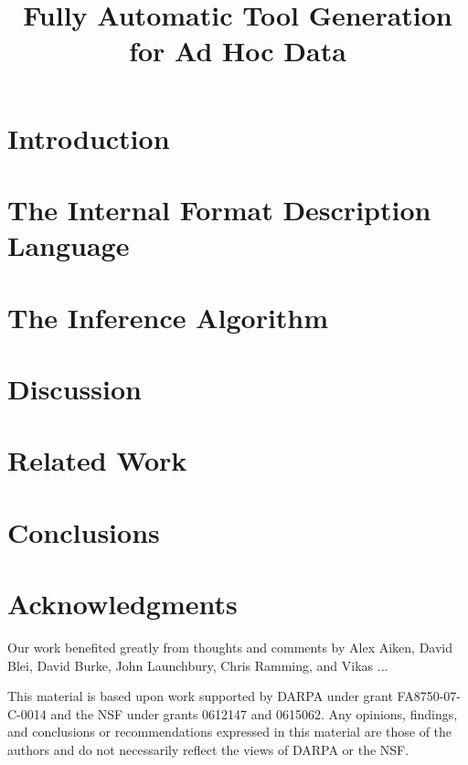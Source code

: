 \documentclass[nocopyrightspace]{sigplanconf}
\begin{document}
\title{Fully Automatic Tool Generation for Ad Hoc Data}

       {}
       {}
       {}
       {}


\maketitle{}

\begin{abstract}  

\end{abstract}

\section {Introduction}
\label{sec:intro}


\section{The Internal Format Description Language}
\label{sec:review}


\section{The Inference Algorithm}
\label{sec:inference}


\section{Discussion}
\label{sec:discussion}


\section{Related Work}
\label{sec:related}



\section{Conclusions}


\section*{Acknowledgments}

Our work benefited greatly from thoughts and comments by
Alex Aiken, David Blei, David Burke, John Launchbury, Chris Ramming, 
and Vikas ...

This material is based upon work 
supported by DARPA under grant FA8750-07-C-0014
and the NSF
   under grants 0612147 and 0615062.
Any opinions, findings, and conclusions or recommendations
   expressed in this material are those of the authors and do not
   necessarily reflect the views of DARPA or the NSF.





\end{document}
